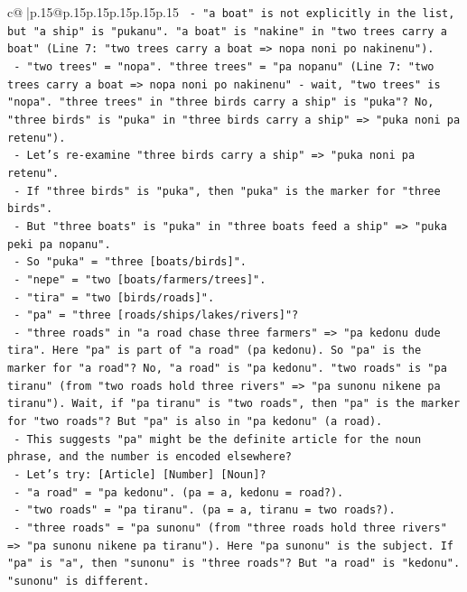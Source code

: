 \documentclass{article}
\begin{document}
{\begin{supertabular}{c@{$\;$}|p{.15\linewidth}@{}p{.15\linewidth}p{.15\linewidth}p{.15\linewidth}p{.15\linewidth}p{.15\linewidth}}
{{{\texttt{                   {-} "a boat" is not explicitly in the list, but "a ship" is "pukanu". "a boat" is "nakine" in "two trees carry a boat" (Line 7: "two trees carry a boat => nopa noni po nakinenu").} \\
\texttt{                   {-} "two trees" = "nopa". "three trees" = "pa nopanu" (Line 7: "two trees carry a boat => nopa noni po nakinenu" {-} wait, "two trees" is "nopa". "three trees" in "three birds carry a ship" is "puka"? No, "three birds" is "puka" in "three birds carry a ship" => "puka noni pa retenu").} \\
\texttt{                   {-} Let's re{-}examine "three birds carry a ship" => "puka noni pa retenu".} \\
\texttt{                     {-} If "three birds" is "puka", then "puka" is the marker for "three birds".} \\
\texttt{                     {-} But "three boats" is "puka" in "three boats feed a ship" => "puka peki pa nopanu".} \\
\texttt{                     {-} So "puka" = "three {[}boats/birds{]}".} \\
\texttt{                     {-} "nepe" = "two {[}boats/farmers/trees{]}".} \\
\texttt{                     {-} "tira" = "two {[}birds/roads{]}".} \\
\texttt{                     {-} "pa" = "three {[}roads/ships/lakes/rivers{]}"?} \\
\texttt{                       {-} "three roads" in "a road chase three farmers" => "pa kedonu dude tira". Here "pa" is part of "a road" (pa kedonu). So "pa" is the marker for "a road"? No, "a road" is "pa kedonu". "two roads" is "pa tiranu" (from "two roads hold three rivers" => "pa sunonu nikene pa tiranu"). Wait, if "pa tiranu" is "two roads", then "pa" is the marker for "two roads"? But "pa" is also in "pa kedonu" (a road).} \\
\texttt{                       {-} This suggests "pa" might be the definite article for the noun phrase, and the number is encoded elsewhere?} \\
\texttt{                       {-} Let's try: {[}Article{]} {[}Number{]} {[}Noun{]}?} \\
\texttt{                         {-} "a road" = "pa kedonu". (pa = a, kedonu = road?).} \\
\texttt{                         {-} "two roads" = "pa tiranu". (pa = a, tiranu = two roads?).} \\
\texttt{                         {-} "three roads" = "pa sunonu" (from "three roads hold three rivers" => "pa sunonu nikene pa tiranu"). Here "pa sunonu" is the subject. If "pa" is "a", then "sunonu" is "three roads"? But "a road" is "kedonu". "sunonu" is different.} \\
}}}
\end{supertabular}}
\end{document}
